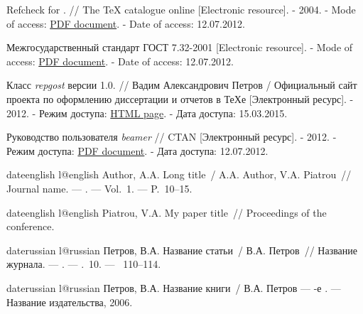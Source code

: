 \begin{thebibliography}{6}
Refcheck for \LaTeXe. //  The \TeX{} catalogue online  [Electronic resource]. - 2004. - Mode of access:
\href{http://www.ctan.org/tex-archive/macros/latex/contrib/refcheck/refdemo.pdf}{PDF document}.  - Date of access: 12.07.2012.

Межгосударственный стандарт ГОСТ 7.32-2001 [Electronic resource]. - Mode of access:
\href{http://txts.mgou.ru/library/stand/20.pdf}{PDF document}.  - Date of access: 12.07.2012.

Класс {\itshape repgost} версии 1.0. // Вадим Александрович Петров / Официальный сайт проекта по оформлению диссертации и отчетов в ТеХе  [Электронный ресурс]. - 2012.
 - Режим доступа: \href{https://github.com/belgraviton/repgost}{HTML page}. - Дата доступа: 15.03.2015.


Руководство пользователя {\itshape beamer} // CTAN  [Электронный ресурс]. - 2012.
 - Режим доступа: \href{http://www.ctan.org/tex-archive/macros/latex/contrib/beamer/doc/beameruserguide.pdf}{PDF document}. - Дата доступа: 12.07.2012.

\end{thebibliography}


% 
% 

\begin{mybibliography}{8}
\def\selectlanguageifdefined#1{
\expandafter\ifx\csname date#1\endcsname\relax
\else\language\csname l@#1\endcsname\fi}

\selectlanguageifdefined{english}
Author, A.A. Long title~/ A.A. Author, V.A. Piatrou~//
  Journal name. ---
. ---
\newblock Vol.~1. ---
\newblock P.~10--15.


\selectlanguageifdefined{english}
Piatrou, V.A. My paper title~// Proceedings of the conference.

\selectlanguageifdefined{russian}
Петров, В.А. Название статьи~/ В.А. Петров~//
  Название журнала. ---
. ---
\newblock \CYRT.~10. ---
~110--114.

\selectlanguageifdefined{russian}
Петров, В.А. Название книги~/ В.А. Петров ---
-е  {\cyr\cyri\cyrz\cyrd.} ---
\newblock Название издательства, 2006.

\end{mybibliography}